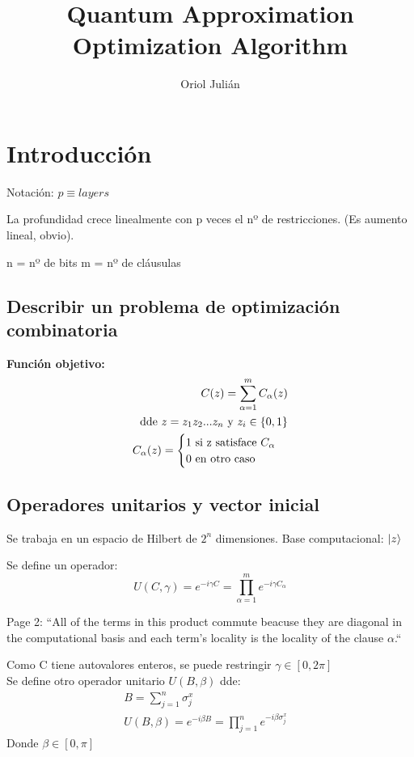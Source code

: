 \documentclass{article}
\title{Quantum Approximation Optimization Algorithm}
\author{Oriol Julián}
\begin{document}
\maketitle{}

\section{Introducción}
\label{sec:qaoa-introduccion}
Notación: \(p \equiv layers\)

La profundidad crece linealmente con p veces el nº de restricciones. (Es aumento lineal, obvio).

n = nº de bits
m = nº de cláusulas

\subsection{Describir un problema de optimización combinatoria}

\textbf{Función objetivo:}
\begin{align*}
  C(z) = \sum_{\alpha = 1}^{m} C_\alpha(z) \\
  \textnormal{ dde } z = z_1z_2...z_n \textnormal{ y } z_i\in \{0, 1\} \\
   C_{\alpha}(z) = \begin{cases}
                     1 \textnormal{ si z satisface } C_\alpha \\
                     0 \textnormal{ en otro caso}
                   \end{cases}
\end{align*}

\subsection{Operadores unitarios y vector inicial}
Se trabaja en un espacio de Hilbert de $2^n$ dimensiones. Base computacional: $\ket{z}$

Se define un operador:
\[ U(C, \gamma) = e^{-i \gamma C} = \prod_{\alpha = 1}^{m} e^{-i \gamma C_\alpha} \]

Page 2: ``All of the terms in this product commute beacuse they are diagonal in the computational basis and each term's locality is the locality of the clause $\alpha$.``

Como C tiene autovalores enteros, se puede restringir $\gamma \in [0, 2\pi]$
\\ Se define otro operador unitario $U(B, \beta)$ dde:
\begin{align*}
  &B = \sum_{j = 1}^n \sigma_j^x &&\\
  &U(B, \beta) = e^{-i \beta B} = \prod_{j=1}^n e^{-i \beta \sigma_j^x}
\end{align*}
Donde $\beta \in [0, \pi]$
\end{document}
